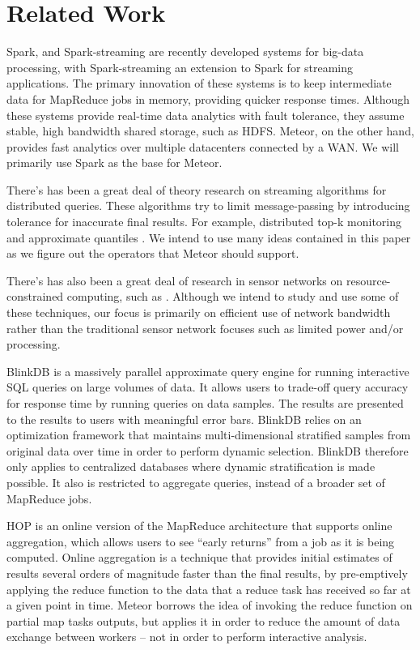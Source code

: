 \section{Related Work}

Spark, and Spark-streaming \cite{1} are recently developed systems for big-data processing, with Spark-streaming an extension to Spark for streaming applications. The primary innovation of these systems is to keep intermediate data for MapReduce jobs in memory, providing quicker response times. Although these systems provide real-time data analytics with fault tolerance, they assume stable, high bandwidth shared storage, such as HDFS. Meteor, on the other hand, provides fast analytics over multiple datacenters connected by a WAN. We will primarily use Spark as the base for Meteor.  

There’s has been a great deal of theory research on streaming algorithms for distributed queries. These algorithms try to limit message-passing by introducing tolerance for inaccurate final results. For example, distributed top-k monitoring \cite{3} and approximate quantiles \cite{6}. We intend to use many ideas contained in this paper as we figure out the operators that Meteor should support. 

There’s has also been a great deal of research in sensor networks on resource-constrained computing, such as \cite{7}. Although we intend to study and use some of these techniques, our focus is primarily on efficient use of network bandwidth rather than the traditional sensor network focuses such as limited power and/or processing.  

BlinkDB \cite{5} is a massively parallel approximate query engine for running interactive SQL queries on large volumes of data. It allows users to trade-off query accuracy for response time by running queries on data samples. The results are presented to the results to users with meaningful error bars. BlinkDB relies on an optimization framework that maintains multi-dimensional stratified samples from original data over time in order to perform dynamic selection. BlinkDB therefore only applies to centralized databases where dynamic stratification is made possible. It also is restricted to aggregate queries, instead of a broader set of MapReduce jobs.

HOP \cite{4} is an online version of the MapReduce architecture that supports online aggregation, which allows users to see “early returns” from a job as it is being computed. Online aggregation is a technique that provides initial estimates of results several orders of magnitude faster than the final results, by pre-emptively applying the reduce function to the data that a reduce task has received so far at a given point in time. Meteor borrows the idea of  invoking the reduce function on partial map tasks outputs, but applies it in order to reduce the amount of data exchange between workers – not in order to perform interactive analysis.